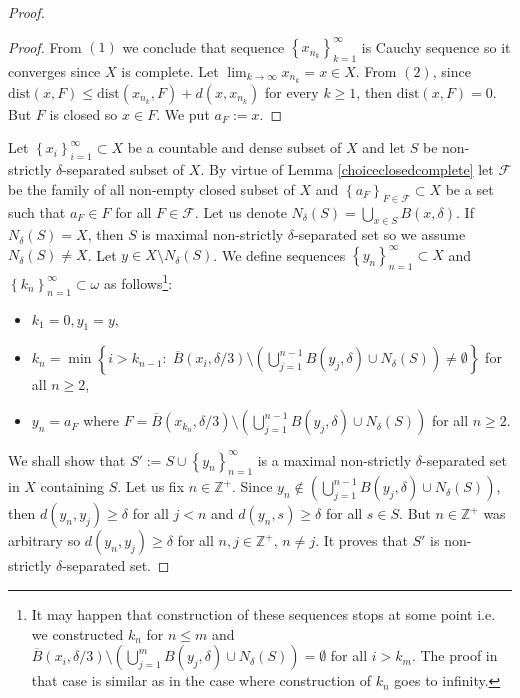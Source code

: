 \documentclass[11pt, reqno]{amsart}
\theoremstyle{definition}
\numberwithin{theorem}{section}
\theoremstyle{definition}
\theoremstyle{definition}
\theoremstyle{definition}
\theoremstyle{definition}
\newcommand{\brac}[1]{\left({#1}\right)}
\theoremstyle{definition}
\numberwithin{claim}{section}
\theoremstyle{definition}
\theoremstyle{definition}
\theoremstyle{definition}
\theoremstyle{definition}
\theoremstyle{definition}
\theoremstyle{remboldstyle}
\begin{document}
\begin{proof}
\begin{proof}
From $(1)$ we conclude that sequence $\left\{x_{n_k}\right\}_{k=1}^\infty$ is Cauchy sequence so it converges since $X$ is complete. Let $\lim_{k\to\infty} x_{n_k} = x \in X$. From $(2)$, since $\text{dist}\brac{x, F} \le \text{dist}\brac{x_{n_k}, F} + d(x, x_{n_k})$ for every $k \ge 1$, then $\text{dist}\brac{x, F} = 0$. But $F$ is closed so $x \in F$. We put $a_F := x$.
\end{proof}
Let $\left\{x_i\right\}_{i=1}^\infty \subset X$ be a countable and dense subset of $X$ and let $S$ be non-strictly $\delta$-separated subset of $X$. By virtue of Lemma \ref{choiceclosedcomplete} let $\mathcal{F}$ be the family of all non-empty closed subset of $X$ and $\left\{a_F\right\}_{F \in \mathcal{F}} \subset X$ be a set such that $a_F \in F$ for all $F \in \mathcal{F}$. Let us denote $N_\delta(S) = \bigcup_{x \in S} B\brac{x, \delta}$. If $N_\delta(S) = X$, then $S$ is maximal non-strictly $\delta$-separated set so we assume $N_\delta(S) \neq X$. Let $y \in X \setminus N_\delta(S)$. We define sequences $\left\{y_n\right\}_{n=1}^\infty \subset X$ and $\left\{k_n\right\}_{n=1}^\infty \subset \omega $ as follows\footnote{It may happen that construction of these sequences stops at some point i.e. we constructed $k_n$ for $n \le m$ and $\overline{B}\brac{x_i, \delta/3} \setminus \brac{\bigcup_{j=1}^{m} B\brac{y_j, \delta} \cup N_\delta(S)} = \emptyset$ for all $i > k_m$. The proof in that case is similar as in the case where construction of $k_n$ goes to infinity.}:

\begin{itemize}
\item $k_1 = 0, y_1 = y$,
\item $k_n = \min\left\{i > k_{n-1}\colon\; \overline{B}\brac{x_i, \delta/3} \setminus \brac{\bigcup_{j=1}^{n-1} B\brac{y_j, \delta} \cup N_\delta(S)} \neq \emptyset\right\}$ for all $n \ge 2$,
\item $y_n = a_F$ where $F = \overline{B}\brac{x_{k_n}, \delta/3} \setminus \brac{\bigcup_{j=1}^{n-1} B\brac{y_j, \delta} \cup N_\delta(S)}$ for all $n \ge 2$.
\end{itemize}

We shall show that $S' := S \cup \left\{y_n\right\}_{n=1}^\infty$ is a maximal non-strictly $\delta$-separated set in $X$ containing $S$. Let us fix $n \in \mathbb{Z}^+$. Since $y_n \notin \brac{\bigcup_{j=1}^{n-1} B\brac{y_j, \delta} \cup N_\delta(S)}$, then $d(y_n, y_j) \ge \delta$ for all $j < n$ and $d(y_n, s) \ge \delta$ for all $s \in S$. But $n \in \mathbb{Z}^+$ was arbitrary so $d(y_n, y_j) \ge \delta$ for all $n, j \in \mathbb{Z}^+$, $n \neq j$. It proves that $S'$ is non-strictly $\delta$-separated set.


\end{proof}
\end{document}
